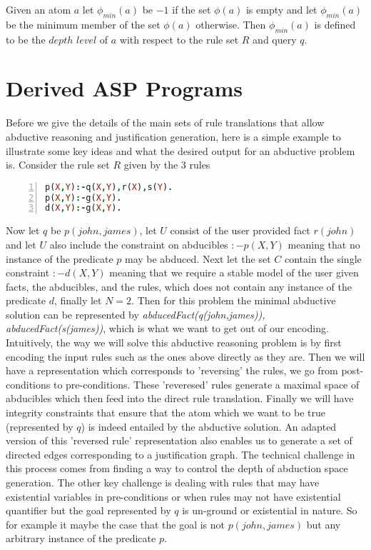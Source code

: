 \documentclass[sigconf]{acmart}
\begin{document}
Given an atom $a$ let $\phi_{min}(a)$ be $-1$ if the set $\phi(a)$ is empty and let $\phi_{min}(a)$ be the minimum member of the set $\phi(a)$ otherwise. Then $\phi_{min}(a)$ is defined to be the $depth$ $level$ of $a$ with respect to the rule set $R$ and query $q$.  

\section{Derived ASP Programs}\label{sec:derived_asp}
Before we give the details of the main sets of rule translations that allow abductive reasoning and justification generation, here is a simple example to illustrate some key ideas and what the desired output for an abductive problem is. Consider the rule set $R$ given by the 3 rules
\begin{lstlisting}[language=Prolog, numbers=left,frame=none]
p(X,Y):-q(X,Y),r(X),s(Y).
p(X,Y):-g(X,Y).
d(X,Y):-g(X,Y).
\end{lstlisting}
Now let $q$ be $p(john,james)$, let $U$ consist of the user provided fact $r(john)$ and let $U$ also include the constraint on abducibles $:-p(X,Y)$ meaning that no instance of the predicate $p$ may be abduced. Next let the set $C$ contain the single constraint $:-d(X,Y)$ meaning that we require a stable model of the user given facts, the abducibles, and the rules, which does not contain any instance of the predicate $d$, finally let $N = 2$. Then for this problem the minimal abductive solution can be represented by \textit{abducedFact(q(john,james)), abducedFact(s(james))}, which is what we want to get out of our encoding. Intuitively, the way we will solve this abductive reasoning problem is by first encoding the input rules such as the ones above directly as they are. Then we will have a representation which corresponds to 'reversing' the rules, \ie we go from post-conditions to pre-conditions. These 'reveresed' rules generate a maximal space of abducibles which then feed into the direct rule translation. Finally we will have integrity constraints that ensure that the atom which we want to be true (represented by $q$) is indeed entailed by the abductive solution. An adapted version of this 'reversed rule' representation also enables us to generate a set of directed edges corresponding to a justification graph. The technical challenge in this process comes from finding a way to control the depth of abduction space generation. The other key challenge is dealing with rules that may have existential variables in pre-conditions or when rules may not have existential quantifier but the goal represented by $q$ is un-ground or existential in nature. So for example it maybe the case that the goal is not $p(john,james)$ but any arbitrary instance of the predicate $p$.    
\end{document}
